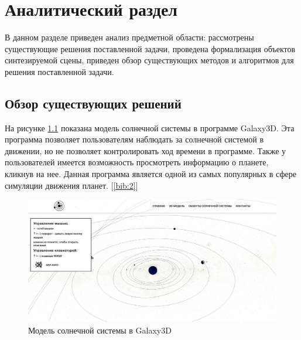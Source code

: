 \chapter{Аналитический раздел}
\label{cha:analytical}
\par В данном разделе приведен анализ предметной области: рассмотрены существующие решения поставленной задачи, проведена формализация объектов синтезируемой сцены, приведен обзор существующих методов и алгоритмов для решения поставленной задачи.

	\section{Обзор существующих решений}
	\par На рисунке \ref{pic:galaxy3d} показана модель солнечной системы в программе Galaxy3D. Эта программа позволяет пользователям наблюдать за солнечной системой в движении, но не позволяет контролировать ход времени в программе. Также у пользователей имеется возможность просмотреть информацию о планете, кликнув на нее. Данная программа является одной из самых популярных в сфере симуляции движения планет. [\ref{bib:2}]
	\begin{figure}[h!]
        \includegraphics[scale=0.35]{inc/SpaceGid.jpg}
        \caption{Модель солнечной системы в Galaxy3D}
        \label{pic:galaxy3d}
	\end{figure}


